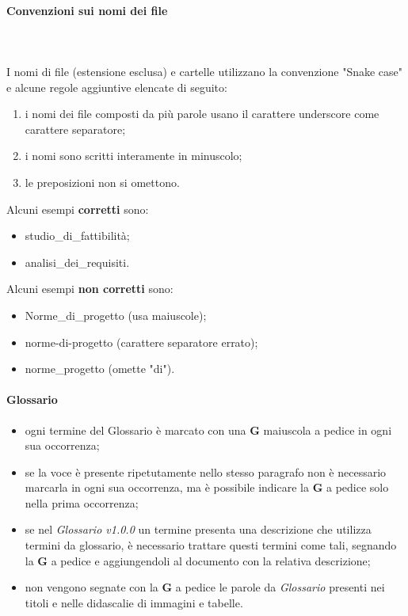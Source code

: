 		\paragraph{Convenzioni sui nomi dei file} \mbox{}\\ \mbox{}\\
		I nomi di file (estensione esclusa) e cartelle utilizzano la convenzione "Snake case\glo" e alcune regole aggiuntive elencate di seguito:
		\begin{enumerate}
			\item i nomi dei file composti da più parole usano il carattere underscore come carattere separatore;
			\item i nomi sono scritti interamente in minuscolo;
			\item le preposizioni non si omettono.
		\end{enumerate}
		Alcuni esempi \textbf{corretti} sono:
		\begin{itemize}
			\item studio\_di\_fattibilità;
			\item analisi\_dei\_requisiti.
		\end{itemize}	 	
		Alcuni esempi \textbf{non corretti} sono: 
		\begin{itemize}
			\item Norme\_di\_progetto (usa maiuscole);
			\item norme-di-progetto (carattere separatore errato);
			\item norme\_progetto (omette "di").
		\end{itemize}
		\paragraph{Glossario}
		\begin{itemize}
			\item ogni termine del Glossario è marcato con una \textbf{G} maiuscola a pedice in ogni sua occorrenza;
			\item se la voce è presente ripetutamente nello stesso paragrafo non è necessario marcarla in ogni sua occorrenza, ma è possibile indicare la \textbf{G} a pedice solo nella prima occorrenza;
			\item se nel \textit{Glossario v1.0.0} un termine presenta una descrizione che utilizza termini da glossario, è necessario trattare questi termini come tali, segnando la \textbf{G} a pedice e aggiungendoli al documento con la relativa descrizione;
			\item non vengono segnate con la \textbf{G} a pedice  le parole da \textit{Glossario} presenti nei titoli e nelle didascalie di immagini e tabelle.
		\end{itemize}			
